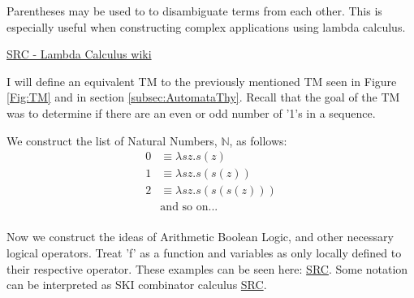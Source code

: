 Parentheses may be used to to disambiguate terms from each other.
This is especially useful when constructing complex applications using lambda calculus.

\href{https://en.wikipedia.org/wiki/Lambda_calculus}{SRC - Lambda Calculus wiki}

I will define an equivalent TM to the previously mentioned TM seen in Figure \ref{Fig:TM} and in section \ref{subsec:AutomataThy}.
Recall that the goal of the TM was to determine if there are an even or odd number of '1's in a sequence.

We construct the list of Natural Numbers, $\mathbb{N}$, as follows:
\[
    \begin{aligned}
        0 &\equiv \lambda sz.s(z)\\
        1 &\equiv \lambda sz.s(s(z))\\
        2 &\equiv \lambda sz.s(s(s(z)))\\
        &\text{and so on...}\\
    \end{aligned}
\]

Now we construct the ideas of Arithmetic Boolean Logic, and other necessary logical operators.
Treat 'f' as a function and variables as only locally defined to their respective operator.
These examples can be seen here: \href{https://jwodder.freeshell.org/lambda.html}{SRC}.
Some notation can be interpreted as SKI combinator calculus \href{https://en.wikipedia.org/wiki/SKI_combinator_calculus}{SRC}.

